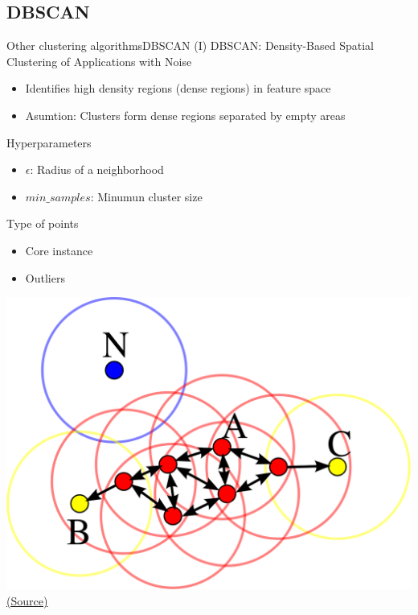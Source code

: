 \documentclass[10pt,compress]{beamer} %
\begin{document}
\subsection{DBSCAN}

\begin{frame}{Other clustering algorithms}{DBSCAN (I)}
	DBSCAN: Density-Based Spatial Clustering of Applications with Noise
	\begin{itemize}
		\item Identifies high density regions (dense regions) in feature space
        \item Asumtion: Clusters form dense regions separated by empty areas
	\end{itemize}
    Hyperparameters
    \begin{itemize}
        \item $\epsilon$: Radius of a neighborhood
        \item $min\_samples$: Minumun cluster size
    \end{itemize}

    Type of points
    \begin{itemize}
        \item Core instance
        \item Outliers
    \end{itemize}

    \vspace{-3cm}
	\begin{flushright} 
        \includegraphics[width=0.5\linewidth]{figs/dbscan.png}
	    \scriptsize\href{https://en.wikipedia.org/wiki/DBSCAN}{(Source)}\hspace{20cm}
    \end{flushright}
\end{frame}

\end{document}
